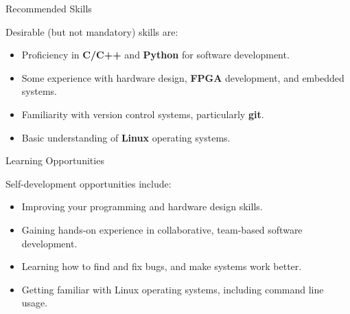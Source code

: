 \documentclass{project-proposal}
\begin{document}
\begin{sectiontwocolumns}
    {Recommended Skills}
    {
        Desirable (but not mandatory) skills are:

        \begin{itemize}
            \item {Proficiency in \textbf{C/C++} and \textbf{Python} for software
                  development.}
            \item {Some experience with hardware design, \textbf{FPGA} development, and
                  embedded systems.}
            \item {Familiarity with version control systems, particularly \textbf{git}.}
            \item {Basic understanding of \textbf{Linux} operating systems.}
        \end{itemize}
    }
    {Learning Opportunities}
    {
        Self-development opportunities include:

        \begin{itemize}
            \item {Improving your programming and hardware design skills.}
            \item {Gaining hands-on experience in collaborative, team-based
                  software development.}
            \item {Learning how to find and fix bugs, and make systems work better.}
            \item {Getting familiar with Linux operating systems, including
                  command line usage.}
        \end{itemize}
    }
\end{sectiontwocolumns}
\end{document}
